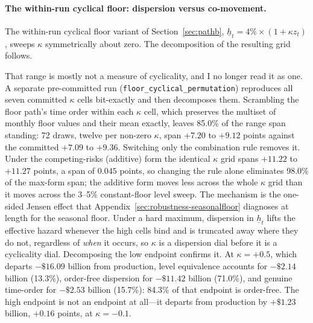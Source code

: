 \documentclass[12pt]{article}
\begin{document}
\paragraph{The within-run cyclical floor: dispersion versus co-movement.}
The within-run cyclical floor variant of Section~\ref{sec:pathb}, $\underline{h}_t = 4\% \times (1 + \kappa z_t)$, sweeps $\kappa$ symmetrically about zero. The decomposition of the resulting grid follows.

That range is mostly not a measure of cyclicality, and I no longer read it as one. A separate pre-committed run (\texttt{floor\_cyclical\_permutation}) reproduces all seven committed $\kappa$ cells bit-exactly and then decomposes them. Scrambling the floor path's time order within each $\kappa$ cell, which preserves the multiset of monthly floor values and their mean exactly, leaves 85.0\% of the range span standing: 72 draws, twelve per non-zero $\kappa$, span $+7.20$ to $+9.12$ points against the committed $+7.09$ to $+9.36$. Switching only the combination rule removes it. Under the competing-risks (additive) form the identical $\kappa$ grid spans $+11.22$ to $+11.27$ points, a span of $0.045$ points, so changing the rule alone eliminates 98.0\% of the max-form span; the additive form moves less across the whole $\kappa$ grid than it moves across the 3--5\% constant-floor level sweep. The mechanism is the one-sided Jensen effect that Appendix~\ref{sec:robustness-seasonalfloor} diagnoses at length for the seasonal floor. Under a hard maximum, dispersion in $\underline{h}_t$ lifts the effective hazard whenever the high cells bind and is truncated away where they do not, regardless of \emph{when} it occurs, so $\kappa$ is a dispersion dial before it is a cyclicality dial. Decomposing the low endpoint confirms it. At $\kappa = +0.5$, which departs $-\$16.09$ billion from production, level equivalence accounts for $-\$2.14$ billion (13.3\%), order-free dispersion for $-\$11.42$ billion (71.0\%), and genuine time-order for $-\$2.53$ billion (15.7\%): 84.3\% of that endpoint is order-free. The high endpoint is not an endpoint at all---it departs from production by $+\$1.23$ billion, $+0.16$ points, at $\kappa = -0.1$.
\end{document}
